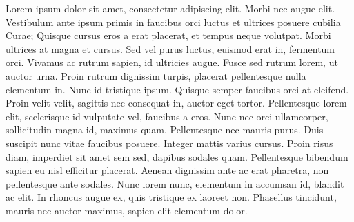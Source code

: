 \documentclass[twoside]{article}
\newcommand{\numpar}[1]{\doinsidethislinehook{#1\markboth{#1}{#1}}}
\begin{document}
\beginnumbering
\autopar

Lorem ipsum dolor sit amet, consectetur adipiscing elit. Morbi nec augue elit. Vestibulum ante ipsum primis in faucibus orci luctus et ultrices posuere cubilia Curae; Quisque cursus eros a erat placerat, et tempus neque volutpat. Morbi ultrices at magna et cursus. Sed\numpar{AAA} vel purus luctus, euismod erat in, fermentum orci. Vivamus ac rutrum sapien, id ultricies augue. Fusce sed rutrum lorem, ut auctor urna. Proin rutrum dignissim turpis, placerat pellentesque nulla elementum in. Nunc id tristique ipsum. Quisque semper faucibus orci at eleifend. Proin velit velit, sagittis nec consequat in, auctor eget tortor. Pellentesque lorem elit, scelerisque id vulputate vel, faucibus a eros. Nunc nec orci ullamcorper, sollicitudin magna id, maximus quam. Pellentesque nec mauris purus. Duis suscipit nunc vitae faucibus posuere. Integer mattis varius cursus. Proin risus diam, imperdiet sit amet sem sed, dapibus sodales quam. Pellentesque bibendum sapien eu nisl efficitur placerat. Aenean dignissim ante ac erat pharetra, non pellentesque ante sodales. Nunc lorem nunc, elementum in accumsan id, blandit ac elit. In rhoncus augue ex, quis tristique ex laoreet non. Phasellus tincidunt, mauris nec auctor maximus,\numpar{BBB} sapien elit elementum dolor.
\end{document}
